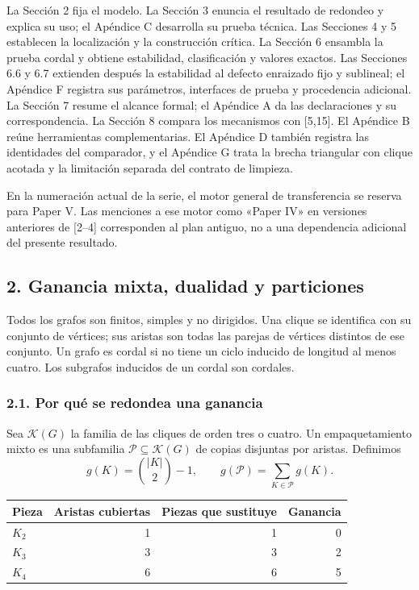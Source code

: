 \documentclass[spanish,11pt,a4paper]{article}
\newcounter{none}
\begin{document}
La Sección 2 fija el modelo. La Sección 3 enuncia el resultado de redondeo y explica su uso; el Apéndice C desarrolla su prueba técnica. Las Secciones 4 y 5 establecen la localización y la construcción crítica. La Sección 6 ensambla la prueba cordal y obtiene estabilidad, clasificación y valores exactos. Las Secciones 6.6 y 6.7 extienden después la estabilidad al defecto enraizado fijo y sublineal; el Apéndice F registra sus parámetros, interfaces de prueba y procedencia adicional. La Sección 7 resume el alcance formal; el Apéndice A da las declaraciones y su correspondencia. La Sección 8 compara los mecanismos con {[}5,15{]}. El Apéndice B reúne herramientas complementarias. El Apéndice D también registra las identidades del comparador, y el Apéndice G trata la brecha triangular con clique acotada y la limitación separada del contrato de limpieza.

En la numeración actual de la serie, el motor general de transferencia se reserva para Paper V. Las menciones a ese motor como «Paper IV» en versiones anteriores de {[}2--4{]} corresponden al plan antiguo, no a una dependencia adicional del presente resultado.

\subsection{2. Ganancia mixta, dualidad y particiones}\label{ganancia-mixta-dualidad-y-particiones}

Todos los grafos son finitos, simples y no dirigidos. Una clique se identifica con su conjunto de vértices; sus aristas son todas las parejas de vértices distintos de ese conjunto. Un grafo es cordal si no tiene un ciclo inducido de longitud al menos cuatro. Los subgrafos inducidos de un cordal son cordales.

\subsubsection{2.1. Por qué se redondea una ganancia}\label{por-que-se-redondea-una-ganancia}

Sea \(\mathcal K(G)\) la familia de las cliques de orden tres o cuatro. Un empaquetamiento mixto es una subfamilia \(\mathcal P\subseteq\mathcal K(G)\) de copias disjuntas por aristas. Definimos \[
g(K)=\binom{|K|}{2}-1,\qquad
g(\mathcal P)=\sum_{K\in\mathcal P}g(K).
\]


{\def\LTcaptype{none} %
\begin{longtable}[c]{@{}lrrr@{}}
\toprule\noalign{}
Pieza & Aristas cubiertas & Piezas que sustituye & Ganancia \\
\midrule\noalign{}
\endhead
\bottomrule\noalign{}
\endlastfoot
\(K_2\) & 1 & 1 & 0 \\
\(K_3\) & 3 & 3 & 2 \\
\(K_4\) & 6 & 6 & 5 \\
\end{longtable}
}
\end{document}
